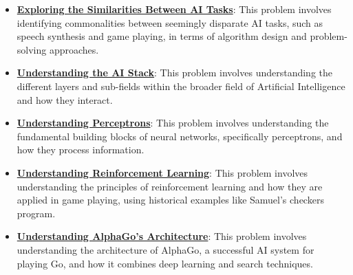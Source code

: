 \documentclass{article}%
\begin{document}
\begin{itemize}[leftmargin=*]
\item \href{https://purdue.brightspace.com/d2l/common/assets/pdfjs-d2l-dist/1.0.14-legacy/web/viewer.html?file=\%2Fcontent\%2Fenforced\%2F1095467-wl.202510.CS.24300.001\%2F02L2-Intro.pdf\%3Fou\%3D1095467\&lang=en-us\&container=d2l-fileviewer-rendered-pdf\&fullscreen=d2l-fileviewer-rendered-pdf-dialog\&height=667#page=31}{\textbf{Exploring the Similarities Between AI Tasks}}: This problem involves identifying commonalities between seemingly disparate AI tasks, such as speech synthesis and game playing, in terms of algorithm design and problem-solving approaches.%
\item \href{https://purdue.brightspace.com/d2l/common/assets/pdfjs-d2l-dist/1.0.14-legacy/web/viewer.html?file=\%2Fcontent\%2Fenforced\%2F1095467-wl.202510.CS.24300.001\%2F02L2-Intro.pdf\%3Fou\%3D1095467\&lang=en-us\&container=d2l-fileviewer-rendered-pdf\&fullscreen=d2l-fileviewer-rendered-pdf-dialog\&height=667#page=44}{\textbf{Understanding the AI Stack}}: This problem involves understanding the different layers and sub-fields within the broader field of Artificial Intelligence and how they interact.%
\item \href{https://purdue.brightspace.com/d2l/common/assets/pdfjs-d2l-dist/1.0.14-legacy/web/viewer.html?file=\%2Fcontent\%2Fenforced\%2F1095467-wl.202510.CS.24300.001\%2F02L2-Intro.pdf\%3Fou\%3D1095467\&lang=en-us\&container=d2l-fileviewer-rendered-pdf\&fullscreen=d2l-fileviewer-rendered-pdf-dialog\&height=667#page=45}{\textbf{Understanding Perceptrons}}: This problem involves understanding the fundamental building blocks of neural networks, specifically perceptrons, and how they process information.%
\item \href{https://purdue.brightspace.com/d2l/common/assets/pdfjs-d2l-dist/1.0.14-legacy/web/viewer.html?file=\%2Fcontent\%2Fenforced\%2F1095467-wl.202510.CS.24300.001\%2F02L2-Intro.pdf\%3Fou\%3D1095467\&lang=en-us\&container=d2l-fileviewer-rendered-pdf\&fullscreen=d2l-fileviewer-rendered-pdf-dialog\&height=667#page=46}{\textbf{Understanding Reinforcement Learning}}: This problem involves understanding the principles of reinforcement learning and how they are applied in game playing, using historical examples like Samuel's checkers program.%
\item \href{https://purdue.brightspace.com/d2l/common/assets/pdfjs-d2l-dist/1.0.14-legacy/web/viewer.html?file=\%2Fcontent\%2Fenforced\%2F1095467-wl.202510.CS.24300.001\%2F02L2-Intro.pdf\%3Fou\%3D1095467\&lang=en-us\&container=d2l-fileviewer-rendered-pdf\&fullscreen=d2l-fileviewer-rendered-pdf-dialog\&height=667#page=50}{\textbf{Understanding AlphaGo's Architecture}}: This problem involves understanding the architecture of AlphaGo, a successful AI system for playing Go, and how it combines deep learning and search techniques.%
\end{itemize}%
\end{document}
